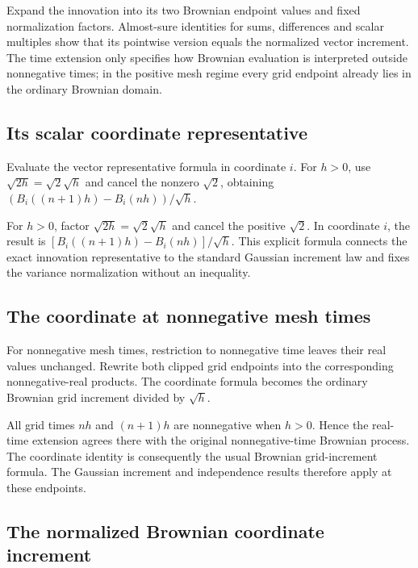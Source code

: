 \documentclass[11pt,a4paper]{report}
\begin{document}
Expand the innovation into its two Brownian endpoint values and fixed normalization factors. Almost-sure identities for sums, differences and scalar multiples show that its pointwise version equals the normalized vector increment. The time extension only specifies how Brownian evaluation is interpreted outside nonnegative times; in the positive mesh regime every grid endpoint already lies in the ordinary Brownian domain.

\subsection{\texorpdfstring{Its scalar coordinate representative}{Its scalar coordinate representative}}
\label{report-step-UnadjustedLangevin-ProductBrownian-lean-7}


Evaluate the vector representative formula in coordinate \(i\). For \(h>0\), use \(\sqrt{2h}=\sqrt2\sqrt h\) and cancel the nonzero \(\sqrt2\), obtaining \((B_i((n+1)h)-B_i(nh))/\sqrt h\).



For \(h>0\), factor \(\sqrt{2h}=\sqrt2\sqrt h\) and cancel the positive \(\sqrt2\). In coordinate \(i\), the result is \([B_i((n+1)h)-B_i(nh)]/\sqrt h\). This explicit formula connects the exact innovation representative to the standard Gaussian increment law and fixes the variance normalization without an inequality.

\subsection{\texorpdfstring{The coordinate at nonnegative mesh times}{The coordinate at nonnegative mesh times}}
\label{report-step-UnadjustedLangevin-ProductBrownian-lean-8}


For nonnegative mesh times, restriction to nonnegative time leaves their real values unchanged. Rewrite both clipped grid endpoints into the corresponding nonnegative-real products. The coordinate formula becomes the ordinary Brownian grid increment divided by \(\sqrt h\).



All grid times \(nh\) and \((n+1)h\) are nonnegative when \(h>0\). Hence the real-time extension agrees there with the original nonnegative-time Brownian process. The coordinate identity is consequently the usual Brownian grid-increment formula. The Gaussian increment and independence results therefore apply at these endpoints.

\subsection{\texorpdfstring{The normalized Brownian coordinate increment}{The normalized Brownian coordinate increment}}
\label{report-step-UnadjustedLangevin-ProductBrownian-lean-9}
\end{document}
